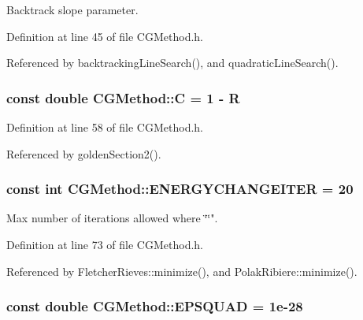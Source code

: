 Backtrack slope parameter. 



Definition at line 45 of file C\+G\+Method.\+h.



Referenced by backtracking\+Line\+Search(), and quadratic\+Line\+Search().

\hypertarget{classCGMethod_af8587ca1c0394c244ce84fe8a6ad29ff}{
\subsubsection[{C}]{\setlength{\rightskip}{0pt plus 5cm}const double C\+G\+Method\+::\+C = 1 -\/ {\bf R}\hspace{0.3cm}{\ttfamily [protected]}}}\label{classCGMethod_af8587ca1c0394c244ce84fe8a6ad29ff}


Definition at line 58 of file C\+G\+Method.\+h.



Referenced by golden\+Section2().

\hypertarget{classCGMethod_aaee1e11813855cc66c360f7cb3d9665a}{
\subsubsection[{E\+N\+E\+R\+G\+Y\+C\+H\+A\+N\+G\+E\+I\+T\+E\+R}]{\setlength{\rightskip}{0pt plus 5cm}const int C\+G\+Method\+::\+E\+N\+E\+R\+G\+Y\+C\+H\+A\+N\+G\+E\+I\+T\+E\+R = 20\hspace{0.3cm}{\ttfamily [protected]}}}\label{classCGMethod_aaee1e11813855cc66c360f7cb3d9665a}


Max number of iterations allowed where \char`\"{}\char`\"{}". 



Definition at line 73 of file C\+G\+Method.\+h.



Referenced by Fletcher\+Rieves\+::minimize(), and Polak\+Ribiere\+::minimize().

\hypertarget{classCGMethod_adb2a688fe52a8729d703d81e52b9fdb3}{
\subsubsection[{E\+P\+S\+Q\+U\+A\+D}]{\setlength{\rightskip}{0pt plus 5cm}const double C\+G\+Method\+::\+E\+P\+S\+Q\+U\+A\+D = 1e-\/28\hspace{0.3cm}{\ttfamily [protected]}}}\label{classCGMethod_adb2a688fe52a8729d703d81e52b9fdb3}


